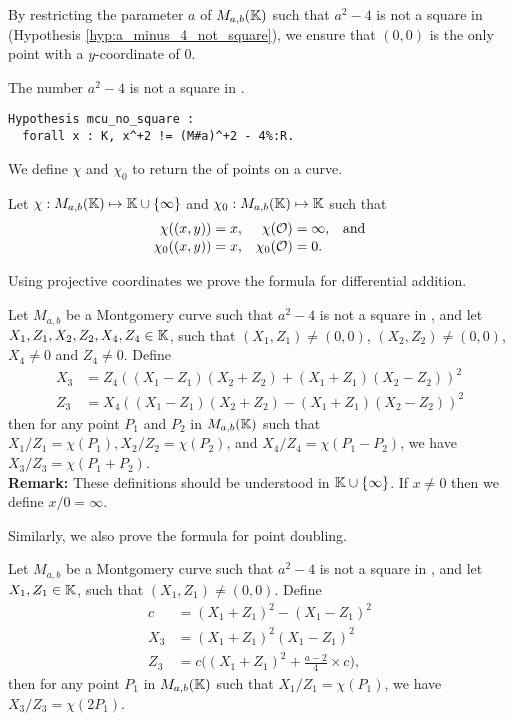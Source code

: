 By restricting the parameter $a$ of $M_{a,b}(\mathbb{K})$ such that $a^2-4$ is not a
square in \K (Hypothesis \ref{hyp:a_minus_4_not_square}),
we ensure that $(0,0)$ is the only point with a $y$-coordinate of $0$.
\begin{hypothesis}
  \label{hyp:a_minus_4_not_square}
  The number $a^2-4$ is not a square in \K.
\end{hypothesis}
\begin{lstlisting}[language=Coq]
Hypothesis mcu_no_square :
  forall x : K, x^+2 != (M#a)^+2 - 4%:R.
\end{lstlisting}

We define $\chi$ and $\chi_0$ to return the \xcoord of points on a curve.
\begin{dfn}
  Let $\chi : M_{a,b}(\mathbb{K}) \mapsto \mathbb{K} \cup \{\infty\}$ and $\chi_0 : M_{a,b}(\mathbb{K}) \mapsto \mathbb{K}$ such that
  \begin{align*}
    \chi((x,y))   & = x, & \chi(\mathcal{O})   & = \infty, &  & \text{and} \\[-0.5ex]
    \chi_0((x,y)) & = x, & \chi_0(\mathcal{O}) & = 0.
  \end{align*}
\end{dfn}

Using projective coordinates we prove the formula for differential addition.%
\begin{lemma}
  \label{lemma:xADD}
  Let $M_{a,b}$ be a Montgomery curve such that $a^2-4$ is not a square in \K, and
  let $X_1, Z_1, X_2, Z_2, X_4, Z_4 \in \mathbb{K}$, such that $(X_1,Z_1) \neq (0,0)$,
  $(X_2,Z_2) \neq (0,0)$, $X_4 \neq 0$ and $Z_4 \neq 0$.
  Define
  \begin{align*}
    X_3 & = Z_4((X_1 - Z_1)(X_2+Z_2) + (X_1+Z_1)(X_2-Z_2))^2 \\[-0.5ex]
    Z_3 & = X_4((X_1 - Z_1)(X_2+Z_2) - (X_1+Z_1)(X_2-Z_2))^2
  \end{align*}
  then for any point $P_1$ and $P_2$ in $M_{a,b}(\mathbb{K})$ such that
  $X_1/Z_1 = \chi(P_1), X_2/Z_2 = \chi(P_2)$, and $X_4/Z_4 = \chi(P_1 - P_2)$,
  we have $X_3/Z_3 = \chi(P_1+P_2)$.\\
  \textbf{Remark:}
  These definitions should be understood in $\mathbb{K} \cup \{\infty\}$.
  If $x\ne 0$ then we define $x/0 = \infty$.
\end{lemma}
Similarly, we also prove the formula for point doubling.%
\begin{lemma}
  \label{lemma:xDBL}
  Let $M_{a,b}$ be a Montgomery curve such that $a^2-4$ is not a square in \K, and
  let $X_1, Z_1 \in \mathbb{K}$, such that $(X_1,Z_1) \neq (0,0)$. Define
  \begin{align*}
    c   & = (X_1 + Z_1)^2 - (X_1 - Z_1)^2                   \\
    X_3 & = (X_1 + Z_1)^2(X_1-Z_1)^2                        \\
    Z_3 & = c\Big((X_1 + Z_1)^2+\frac{a-2}{4}\times c\Big),
  \end{align*}
  then for any point $P_1$ in $M_{a,b}(\mathbb{K})$ such that $X_1/Z_1 = \chi(P_1)$,
  we have $X_3/Z_3 = \chi(2P_1)$.
\end{lemma}

